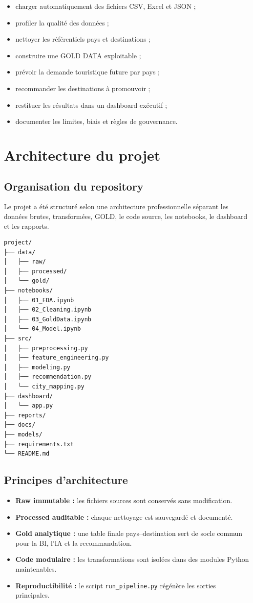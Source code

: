 \documentclass[11pt,a4paper]{report}
\begin{document}
\begin{itemize}[leftmargin=*]
    \item charger automatiquement des fichiers CSV, Excel et JSON ;
    \item profiler la qualité des données ;
    \item nettoyer les référentiels pays et destinations ;
    \item construire une GOLD DATA exploitable ;
    \item prévoir la demande touristique future par pays ;
    \item recommander les destinations à promouvoir ;
    \item restituer les résultats dans un dashboard exécutif ;
    \item documenter les limites, biais et règles de gouvernance.
\end{itemize}

\chapter{Architecture du projet}

\section{Organisation du repository}

Le projet a été structuré selon une architecture professionnelle séparant les données brutes, transformées, GOLD, le code source, les notebooks, le dashboard et les rapports.

\begin{lstlisting}[language=bash,caption={Architecture du repository}]
project/
├── data/
│   ├── raw/
│   ├── processed/
│   └── gold/
├── notebooks/
│   ├── 01_EDA.ipynb
│   ├── 02_Cleaning.ipynb
│   ├── 03_GoldData.ipynb
│   └── 04_Model.ipynb
├── src/
│   ├── preprocessing.py
│   ├── feature_engineering.py
│   ├── modeling.py
│   ├── recommendation.py
│   └── city_mapping.py
├── dashboard/
│   └── app.py
├── reports/
├── docs/
├── models/
├── requirements.txt
└── README.md
\end{lstlisting}

\section{Principes d'architecture}

\begin{itemize}[leftmargin=*]
    \item \textbf{Raw immutable :} les fichiers sources sont conservés sans modification.
    \item \textbf{Processed auditable :} chaque nettoyage est sauvegardé et documenté.
    \item \textbf{Gold analytique :} une table finale pays--destination sert de socle commun pour la BI, l'IA et la recommandation.
    \item \textbf{Code modulaire :} les transformations sont isolées dans des modules Python maintenables.
    \item \textbf{Reproductibilité :} le script \texttt{run\_pipeline.py} régénère les sorties principales.
\end{itemize}
\end{document}
